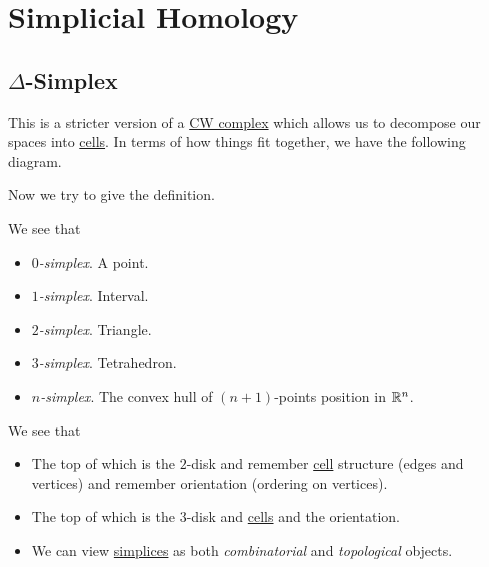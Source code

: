 \section{Simplicial Homology}
\subsection{\(\Delta\)-Simplex}
This is a stricter version of a \hyperref[def:CW-Complex]{CW complex} which allows us to decompose our spaces into \hyperref[def:cell]{cells}.
In terms of how things fit together, we have the following diagram.
\begin{figure}[H]
	\centering
	\label{fig:simplicial-homology-venn-diagram}
\end{figure}

Now we try to give the definition.
\begin{definition}[Simplex]\label{def:simplex}
	We see that
	\begin{itemize}
		\item \emph{\(0\)-simplex}. A point.
		\item \emph{\(1\)-simplex}. Interval.
		\item \emph{\(2\)-simplex}. Triangle.
		\item \emph{\(3\)-simplex}. Tetrahedron.
		\item \emph{\(n\)-simplex}. The convex hull of \((n+1)\)-points position in \(\mathbb{\MakeUppercase{r}} ^n\).
	\end{itemize}
	\begin{figure}[H]
		\centering
		\label{fig:def:simplex}
	\end{figure}
\end{definition}
\begin{remark}
	We see that
	\begin{itemize}
		\item The top of which is the \(2\)-disk and remember \hyperref[def:cell]{cell} structure (edges and vertices) and remember orientation (ordering on vertices).
		\item The top of which is the \(3\)-disk and \hyperref[def:cell]{cells} and the orientation.
		\item We can view \hyperref[def:simplex]{simplices} as both \emph{combinatorial} and \emph{topological} objects.
	\end{itemize}
\end{remark}

